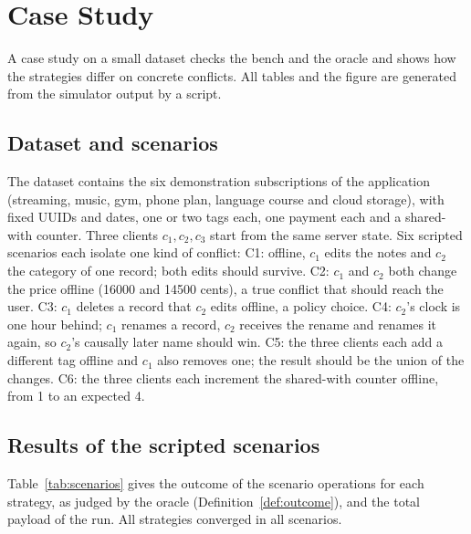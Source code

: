 \section{Case Study}\label{sec:case}

A case study on a small dataset checks the bench and the oracle and shows how the strategies differ on concrete
conflicts. All tables and the figure are generated from the simulator output by a script.

\subsection{Dataset and scenarios}
The dataset contains the six demonstration subscriptions of the application (streaming, music, gym, phone plan,
language course and cloud storage), with fixed UUIDs and dates, one or two tags each, one payment each and a
shared-with counter. Three clients $c_1, c_2, c_3$ start from the same server state. Six scripted scenarios each
isolate one kind of conflict:
C1: offline, $c_1$ edits the notes and $c_2$ the category of one record; both edits should survive.
C2: $c_1$ and $c_2$ both change the price offline (16000 and 14500 cents), a true conflict that should reach the user.
C3: $c_1$ deletes a record that $c_2$ edits offline, a policy choice. C4: $c_2$'s clock is one hour behind; $c_1$
renames a record, $c_2$ receives the rename and renames it again, so $c_2$'s causally later name should win. C5: the
three clients each add a different tag offline and $c_1$ also removes one; the result should be the union of the
changes. C6: the three clients each increment the shared-with counter offline, from 1 to an expected 4.

\subsection{Results of the scripted scenarios}
Table~\ref{tab:scenarios} gives the outcome of the scenario operations for each strategy, as judged by the oracle
(Definition~\ref{def:outcome}), and the total payload of the run. All strategies converged in all scenarios.

\begin{table}[ht]
\caption{Scripted scenarios C1--C6: lost and surfaced operations, policy applied to the ambiguous pair of C3, and
total payload. An asterisk marks a causal violation (a stale value won).}
\label{tab:scenarios}
\footnotesize
\setlength{\tabcolsep}{4pt}

\end{table}

